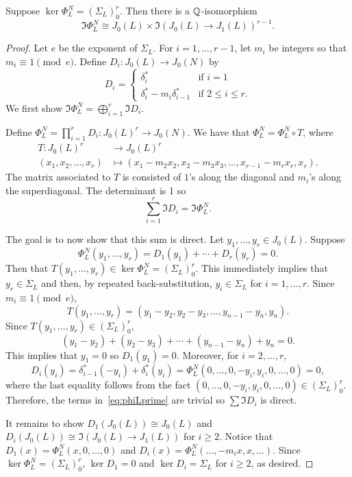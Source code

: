 \begin{proposition}
    \label{prop:decomp}
    Suppose $\ker\Phi_L ^N=(\Sigma_L)_0 ^r$. Then there is a $\mathbb{Q}$-isomorphism
    \[
        \Im\Phi_L ^N \cong J_0(L)\times \Im(J_0(L)\to J_1(L))^{r-1}.
    \]
\end{proposition}
\begin{proof}
    Let $e$ be the exponent of $\Sigma_L$. For $i=1,\ldots,r-1$, let $m_i$ be
    integers so that $m_i \equiv 1 \pmod{e}$. Define $D_i:J_0(L)\to J_0(N)$ by
    \[
        D_i =
        \begin{cases}
            \delta_i ^*                   & \text{if } i = 1\\
            \delta_i ^* - m_i \delta_{i-1} ^* & \text{if } 2\leq i \leq r.
        \end{cases}
    \]
    We first show $\Im\Phi_L ^N = \bigoplus_{i=1} ^r \Im D_i$.

    Define $\Phi_L ^N =\prod_{i=1} ^r D_i : J_0(L)^r \to J_0(N)$. We have that
    $\Phi_L ^N = \Phi_L ^N \circ T$, where
    \begin{align*}
        T:J_0(L)^r & \to J_0(L)^r \\
        (x_1,x_2,\ldots,x_r)&\mapsto (x_1-m_2x_2,x_2-m_3 x_3,\ldots,x_{r-1}-m_r
        x_r, x_r).
    \end{align*}
    The matrix associated to $T$ is consisted of $1$'s along the diagonal and
    $m_i$'s along the superdiagonal. The determinant is 1 so
    \[
        \sum_{i=1} ^r \Im D_i = \Im \Phi_L ^N.
    \]

    The goal is to now show that this sum is direct. Let $y_1,\ldots,y_r\in
    J_0(L)$. Suppose
    \begin{equation}
        \label{eq:phiLprime}
        \Phi_L ^N (y_1,\ldots,y_r) =D_1(y_1)+ \cdots +D_r(y_r)=0.
    \end{equation}
    Then that $T(y_1,\ldots,y_r)\in \ker\Phi_L ^N=(\Sigma_L)_0 ^r$.  This
    immediately implies that $y_r\in \Sigma_L$ and then, by repeated
    back-substitution, $y_i\in \Sigma_L$ for $i=1,\ldots,r$. Since $m_i \equiv
    1 \pmod{e}$,
    \[
        T(y_1,\ldots,y_r)=(y_1-y_2,y_2-y_3,\ldots,y_{n-1}-y_n,y_n).
    \]
    Since $T(y_1,\ldots,y_r)\in (\Sigma_L)_0 ^r$,
    \[
        (y_1-y_2)+(y_2-y_3)+\cdots+(y_{n-1}-y_n)+y_n =0.
    \]
    This implies that $y_1=0$ so $D_1(y_1)=0$. Moreover, for $i=2,\ldots,r$,
    \begin{equation*}
        D_i(y_i)
            = \delta_{i-1} ^*(-y_i) + \delta_i ^* (y_i)
            = \Phi_L ^N (0,\ldots,0,-y_i,y_i,0,\ldots,0)
            = 0,
    \end{equation*}
    where the last equality follows from the fact
    $(0,\ldots,0,-y_i,y_i,0,\ldots,0)\in (\Sigma_L)_0 ^r$. Therefore, the terms
    in~\eqref{eq:phiLprime} are trivial so $\sum \Im D_i$ is direct.

    It remains to show $D_1(J_0(L))\cong J_0(L)$ and $D_i(J_0(L))\cong
    \Im(J_0(L)\to J_1(L))$ for $i\geq 2$. Notice that $D_1(x)=\Phi_L
    ^N(x,0,\ldots,0)$ and $D_i(x)=\Phi_L ^N(\ldots,-m_ix,x,\ldots)$. Since
    $\ker\Phi_L ^N=(\Sigma_L)_0 ^r$, $\ker D_1=0$ and $\ker D_i=\Sigma_L$ for
    $i\geq 2$, as desired.
\end{proof}

